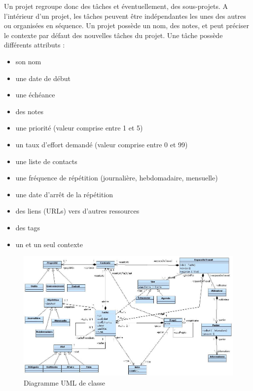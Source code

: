 Un projet regroupe donc des tâches et éventuellement, des sous-projets. A l’intérieur d’un projet, les tâches peuvent être indépendantes les unes des autres ou organisées en séquence. Un projet possède un nom, des notes, et peut préciser le contexte par défaut des nouvelles tâches du projet.
Une tâche possède différents attributs : \\
\begin{itemize}
\item son nom
\item une date de début
\item une échéance
\item des notes
\item une priorité (valeur comprise entre 1 et 5)
\item un taux d’effort demandé (valeur comprise entre 0 et 99)
\item une liste de contacts
\item une fréquence de répétition (journalière, hebdomadaire, mensuelle)
\item une date d’arrêt de la répétition
\item des liens (URLs) vers d’autres ressources
\item des tags
\item un et un seul contexte
\end{itemize} 


\begin{figure}[H]
\begin{center}
\includegraphics[scale=0.5,angle=90]{diagrams/diag_class.png}
\caption{Diagramme UML de classe}
\end{center}
\end{figure}



\cfoot{\thepage}
